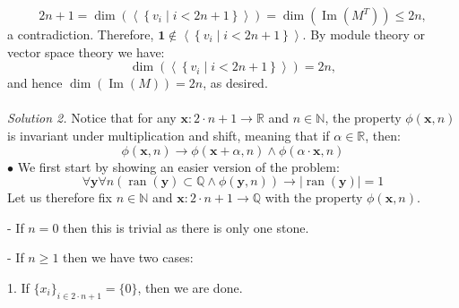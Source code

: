 \documentclass[11pt, a4paper, oneside]{article}
\theoremstyle{remark}
\theoremstyle{lemma}
\begin{document}
\[
2n+1 = \dim\left( \left\langle \left\{ v_i \mid i < 2n+1 \right\} \right\rangle \right) = \dim\left( \operatorname{Im}\left(M^T\right) \right) \leq 2n,
\]
a contradiction. Therefore, \( \mathbf{1} \notin \left\langle \left\{ v_i \mid i < 2n+1 \right\} \right\rangle \). By module theory or vector space theory we have:
\[
\dim\left( \left\langle \left\{ v_i \mid i < 2n+1 \right\}\right\rangle\right) = 2n,
\]
and hence \( \dim\left( \operatorname{Im}(M) \right) = 2n \), as desired.
\\\\
\textit{Solution 2.}
Notice that for any $\mathbf{x}: 2 \cdot n + 1 \to \mathbb{R}$ and $n \in \mathbb{N}$, the property $\phi(\mathbf{x}, n)$ is invariant under multiplication and shift, meaning that if $\alpha \in \mathbb{R}$, then:
$$
\phi(\mathbf{x}, n) \rightarrow \phi(\mathbf{x} + \alpha, n) \wedge \phi(\alpha \cdot \mathbf{x}, n)
$$
$\bullet$ We first start by showing an easier version of the problem:
$$
\forall \mathbf{y} \forall n \left( \operatorname{ran}(\mathbf{y}) \subset \mathbb{Q} \wedge \phi(\mathbf{y}, n) \right) \rightarrow | \operatorname{ran}(\mathbf{y}) | = 1
$$
Let us therefore fix $n \in \mathbb{N}$ and $\mathbf{x}: 2 \cdot n + 1 \to \mathbb{Q}$ with the property $\phi(\mathbf{x}, n)$.

- If $n = 0$ then this is trivial as there is only one stone.

- If $n \geq 1$ then we have two cases:

1. If $\{x_i\}_{i \in 2 \cdot n + 1} = \{0\}$, then we are done.
\end{document}
